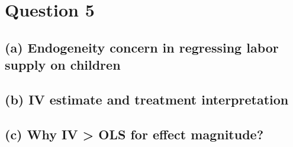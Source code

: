 \documentclass{scrartcl}
\begin{document}
\section*{Question 5}

\subsection*{(a) Endogeneity concern in regressing labor supply on children}


\subsection*{(b) IV estimate and treatment interpretation}


\subsection*{(c) Why IV > OLS for effect magnitude?}

\end{document}
